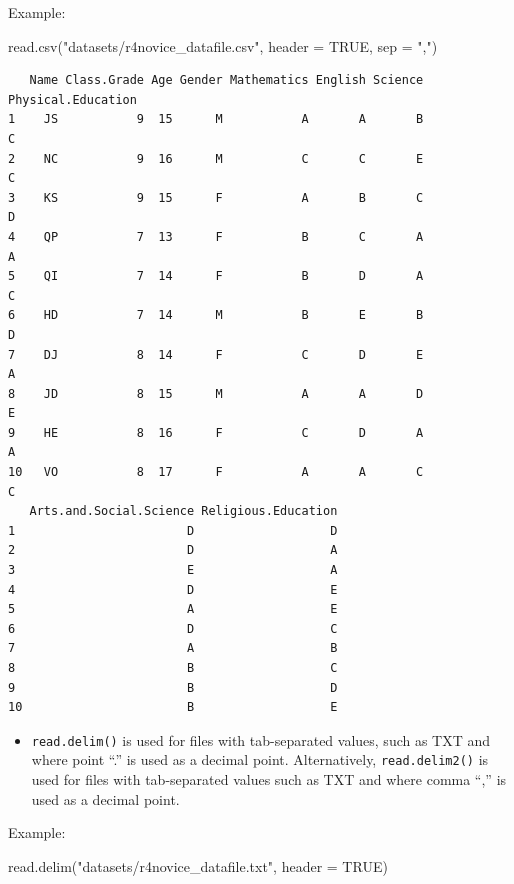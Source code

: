 \documentclass[
  letterpaper,
  DIV=11,
  numbers=noendperiod]{scrreprt}
\newenvironment{Shaded}{\begin{snugshade}}{\end{snugshade}}
\newcommand{\AttributeTok}[1]{\textcolor[rgb]{0.40,0.45,0.13}{#1}}
\newcommand{\ConstantTok}[1]{\textcolor[rgb]{0.56,0.35,0.01}{#1}}
\newcommand{\FunctionTok}[1]{\textcolor[rgb]{0.28,0.35,0.67}{#1}}
\newcommand{\NormalTok}[1]{\textcolor[rgb]{0.00,0.23,0.31}{#1}}
\newcommand{\StringTok}[1]{\textcolor[rgb]{0.13,0.47,0.30}{#1}}
\providecommand{\tightlist}{%
  \setlength{\itemsep}{0pt}\setlength{\parskip}{0pt}}\usepackage{longtable,booktabs,array}
\begin{document}
Example:

\begin{Shaded}
\begin{Highlighting}[]
\FunctionTok{read.csv}\NormalTok{(}\StringTok{"datasets/r4novice\_datafile.csv"}\NormalTok{, }\AttributeTok{header =} \ConstantTok{TRUE}\NormalTok{, }\AttributeTok{sep =} \StringTok{","}\NormalTok{)}
\end{Highlighting}
\end{Shaded}

\begin{verbatim}
   Name Class.Grade Age Gender Mathematics English Science Physical.Education
1    JS           9  15      M           A       A       B                  C
2    NC           9  16      M           C       C       E                  C
3    KS           9  15      F           A       B       C                  D
4    QP           7  13      F           B       C       A                  A
5    QI           7  14      F           B       D       A                  C
6    HD           7  14      M           B       E       B                  D
7    DJ           8  14      F           C       D       E                  A
8    JD           8  15      M           A       A       D                  E
9    HE           8  16      F           C       D       A                  A
10   VO           8  17      F           A       A       C                  C
   Arts.and.Social.Science Religious.Education
1                        D                   D
2                        D                   A
3                        E                   A
4                        D                   E
5                        A                   E
6                        D                   C
7                        A                   B
8                        B                   C
9                        B                   D
10                       B                   E
\end{verbatim}

\begin{itemize}
\tightlist
\item
  \texttt{read.delim()} is used for files with tab-separated values,
  such as TXT and where point ``.'' is used as a decimal point.
  Alternatively, \texttt{read.delim2()} is used for files with
  tab-separated values such as TXT and where comma ``,'' is used as a
  decimal point.
\end{itemize}

Example:

\begin{Shaded}
\begin{Highlighting}[]
\FunctionTok{read.delim}\NormalTok{(}\StringTok{"datasets/r4novice\_datafile.txt"}\NormalTok{, }\AttributeTok{header =} \ConstantTok{TRUE}\NormalTok{)}
\end{Highlighting}
\end{Shaded}
\end{document}
